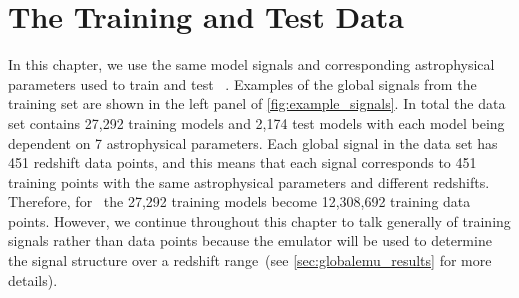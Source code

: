     
\section{The Training and Test Data}
\label{sec:training_data}

In this chapter, we use the same model signals and corresponding astrophysical parameters used to train and test \cmGEM~\citep[available at \url{https://doi.org/10.5281/zenodo.4541500},][]{Cohen2021Data}. Examples of the global signals from the training set are shown in the left panel of \cref{fig:example_signals}. In total the data set contains 27,292 training models and 2,174 test models with each model being dependent on 7 astrophysical parameters. Each global signal in the data set has 451 redshift data points, and this means that each signal corresponds to 451 training points with the same astrophysical parameters and different redshifts. Therefore, for \name~the 27,292 training models become 12,308,692 training data points. However, we continue throughout this chapter to talk generally of training signals rather than data points because the emulator will be used to determine the signal structure over a redshift range~(see \cref{sec:globalemu_results} for more details).

